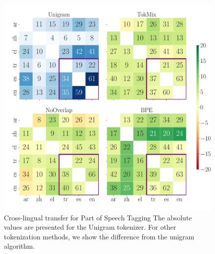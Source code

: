 
\begin{figure}[tb!]
    \centering
    \includegraphics[width=1.0\linewidth]{figures/POS_F1_transfer_.pdf}
    
    \caption{Cross-lingual transfer for Part of Speech Tagging The absolute values are presented for the Unigram tokenizer. For other tokenization methods, we show  the difference from the unigram algorithm.}
    \label{fig:pos_transfer}
\end{figure}